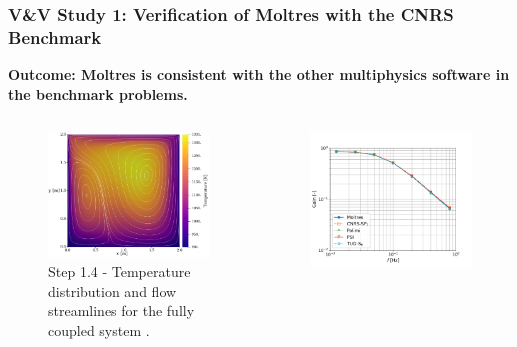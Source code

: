 \begin{frame}
  \frametitle{V\&V Study 1: Verification of Moltres with the CNRS Benchmark}
  \textbf{Outcome: Moltres is consistent with the other multiphysics software in the benchmark
  problems.}
  \begin{columns}
    \hfill
    \column[t]{4cm}
    \vspace{.3cm}
    \begin{figure}
      \centering
      \includegraphics[width=\columnwidth]{../images/full-coupled}
      \caption{Step 1.4 - Temperature distribution and flow streamlines for the fully
      coupled system \cite{park_verification_2022}.}
    \end{figure}
    \column[t]{4cm}
    \begin{figure}
      \centering
      \includegraphics[width=\columnwidth]{../images/2-1-gain-plot}

\end{figure}
\end{columns}
\end{frame}
